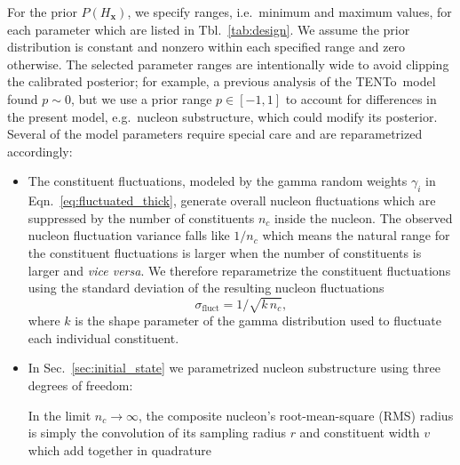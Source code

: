 \documentclass[aps,prc,reprint,amsmath,nofootinbib]{revtex4-1}
\newcommand{\trento}{T\raisebox{-0.5ex}{R}ENTo}
\newcommand{\x}{\mathbf x}
\begin{document}
For the prior $P(H_\x)$, we specify ranges, i.e.\ minimum and maximum values, for each parameter which are listed in Tbl.~\ref{tab:design}.
We assume the prior distribution is constant and nonzero within each specified range and zero otherwise.
The selected parameter ranges are intentionally wide to avoid clipping the calibrated posterior; for example, a previous analysis of the \trento\ model \cite{Bernhard:2016tnd} found $p \sim 0$, but we use a prior range $p \in [-1, 1]$ to account for differences in the present model, e.g.\ nucleon substructure, which could modify its posterior.
Several of the model parameters require special care and are reparametrized accordingly:
\begin{itemize}[leftmargin=1\parindent]
  \item
    The constituent fluctuations, modeled by the gamma random weights $\gamma_i$ in Eqn.~\eqref{eq:fluctuated_thick}, generate overall nucleon fluctuations which are suppressed by the number of constituents $n_c$ inside the nucleon.
    The observed nucleon fluctuation variance falls like $1 / n_c$ which means the natural range for the constituent fluctuations is larger when the number of constituents is larger and \emph{vice versa}.
    We therefore reparametrize the constituent fluctuations using the standard deviation of the resulting nucleon fluctuations
    \begin{equation}
      \sigma_\mathrm{fluct} = 1 / \sqrt{k\, n_c},
    \end{equation}
    where $k$ is the shape parameter of the gamma distribution used to fluctuate each individual constituent.
  \item
    In Sec.~\ref{sec:initial_state} we parametrized nucleon substructure using three degrees of freedom:
    In the limit $n_c \to \infty$, the composite nucleon's root-mean-square (RMS) radius is simply the convolution of its sampling radius $r$ and constituent width $v$ which add together in quadrature
    \begin{equation}

\end{equation}
\end{itemize}
\end{document}

